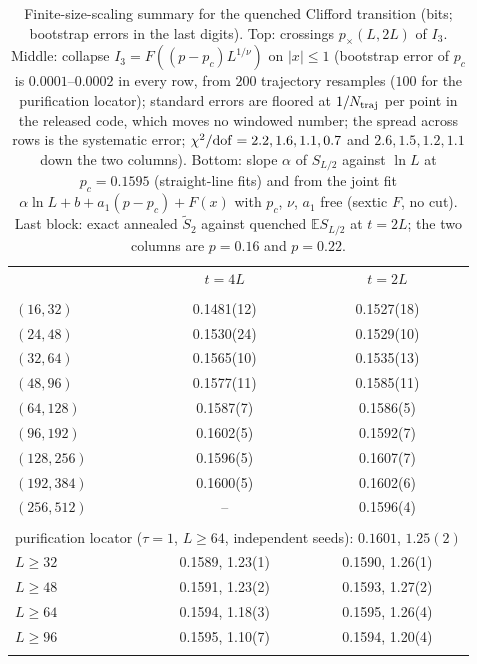 \documentclass[aps,prx,reprint,superscriptaddress,nobibnotes,longbibliography]{revtex4-2}
\theoremstyle{remark}
\newcommand{\E}{\mathbb E}
\begin{document}
\begin{table}[t]
\caption{Finite-size-scaling summary for the quenched Clifford transition (bits; bootstrap errors in the last digits).  Top: crossings $p_\times(L,2L)$ of $I_3$.  Middle: collapse $I_3=F((p-p_c)L^{1/\nu})$ on $|x|\le1$ (bootstrap error of $p_c$ is $0.0001$--$0.0002$ in every row, from $200$ trajectory resamples ($100$ for the purification locator); standard errors are floored at $1/N_{\rm traj}$ per point in the released code, which moves no windowed number; the spread across rows is the systematic error; $\chi^2/{\rm dof}=2.2,1.6,1.1,0.7$ and $2.6,1.5,1.2,1.1$ down the two columns).  Bottom: slope $\alpha$ of $S_{L/2}$ against $\ln L$ at $p_c=0.1595$ (straight-line fits) and from the joint fit $\alpha\ln L+b+a_1(p-p_c)+F(x)$ with $p_c$, $\nu$, $a_1$ free (sextic $F$, no cut).  Last block: exact annealed $\tilde S_2$ against quenched $\E S_{L/2}$ at $t=2L$; the two columns are $p=0.16$ and $p=0.22$.}
\label{tab:numerics}
\begin{ruledtabular}
\begin{tabular}{lcc}
 & $t=4L$ & $t=2L$ \\
\colrule
\multicolumn{3}{l}{crossings $p_\times(L,2L)$ of $I_3$} \\
$(16,32)$ & 0.1481(12) & 0.1527(18) \\
$(24,48)$ & 0.1530(24) & 0.1529(10) \\
$(32,64)$ & 0.1565(10) & 0.1535(13) \\
$(48,96)$ & 0.1577(11) & 0.1585(11) \\
$(64,128)$ & 0.1587(7) & 0.1586(5) \\
$(96,192)$ & 0.1602(5) & 0.1592(7) \\
$(128,256)$ & 0.1596(5) & 0.1607(7) \\
$(192,384)$ & 0.1600(5) & 0.1602(6) \\
$(256,512)$ & -- & 0.1596(4) \\
\colrule
\multicolumn{3}{l}{collapse of $I_3$: $p_c$, $\nu$} \\
\multicolumn{3}{l}{purification locator ($\tau=1$, $L\ge64$, independent seeds): $0.1601$, $1.25(2)$} \\
$L\ge32$ & 0.1589, 1.23(1) & 0.1590, 1.26(1) \\
$L\ge48$ & 0.1591, 1.23(2) & 0.1593, 1.27(2) \\
$L\ge64$ & 0.1594, 1.18(3) & 0.1595, 1.26(4) \\
$L\ge96$ & 0.1595, 1.10(7) & 0.1594, 1.20(4) \\
\colrule
\multicolumn{3}{l}{$\alpha$ from $S_{L/2}=\alpha\ln L+b$ at $p_c$} \\

\end{tabular}
\end{ruledtabular}
\end{table}
\end{document}
